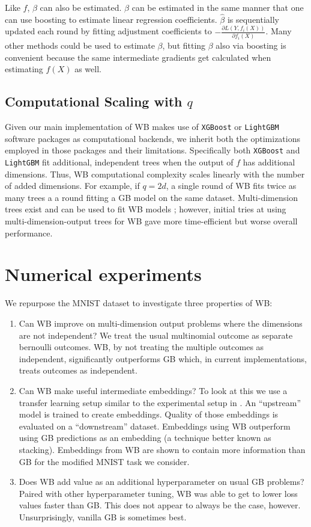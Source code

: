 \documentclass{article}
\begin{document}
Like $f$, $\beta$ can also be estimated. $\beta$ can be estimated in the same manner that one can use boosting to estimate linear regression coefficients. $\hat{\beta}$ is sequentially updated each round by fitting adjustment coefficients to $-\frac{\partial L(Y,f_i(X))}{\partial f_i(X) }$.  Many other methods could be used to estimate $\beta$, but fitting $\beta$ also via boosting is convenient because the same intermediate gradients get calculated when estimating $f(X)$ as well.

\subsection{Computational Scaling with $q$}

Given our main implementation of WB makes use of \texttt{XGBoost} or \texttt{LightGBM} software packages as computational backends, we inherit both the optimizations employed in those packages and their limitations. Specifically both \texttt{XGBoost} and \texttt{LightGBM} fit additional, independent trees when the output of $f$ has additional dimensions. Thus, WB computational complexity scales linearly with the number of added dimensions.  For example, if $q = 2d$, a single round of WB fits twice as many trees a a round fitting a GB model on the same dataset. Multi-dimension trees exist and can be used to fit WB models \citep{multitree}; however, initial tries at using multi-dimension-output trees for WB gave more time-efficient but worse overall performance.

\section{Numerical experiments}
\label{exp}

We repurpose the MNIST dataset \cite{mnist} to investigate three properties of WB:
\begin{enumerate}
    \item Can WB improve on multi-dimension output problems where the dimensions are not independent? We treat the usual multinomial outcome as separate bernoulli outcomes. WB, by not treating the multiple outcomes as independent, significantly outperforms GB which, in current implementations, treats outcomes as independent.
    \item Can WB make useful intermediate embeddings?  To look at this we use a transfer learning setup similar to the experimental setup in \cite{levin2022transfer}. An ``upstream'' model is trained to create embeddings. Quality of those embeddings is evaluated on a ``downstream'' dataset. Embeddings using WB outperform using GB predictions as an embedding (a technique better known as stacking). Embeddings from WB are shown to contain more information than GB for the modified MNIST task we consider.
    \item Does WB add value as an additional hyperparameter on usual GB problems? Paired with other hyperparameter tuning, WB was able to get to lower loss values faster than GB. This does not appear to always be the case, however. Unsurprisingly, vanilla GB is sometimes best.
\end{enumerate}
\end{document}
